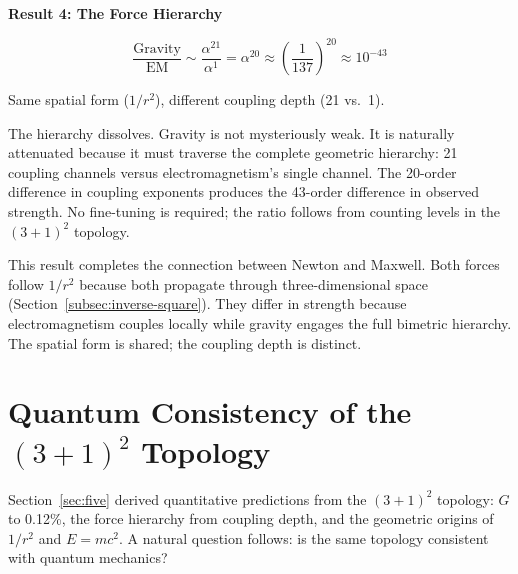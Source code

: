\documentclass[aps,prd,preprint,superscriptaddress,showpacs,preprintnumbers,amsmath,amssymb,nofootinbib]{revtex4-2}
\begin{document}
\vspace{1.5em}
\noindent
\colorbox{resultgreen}{\parbox{\dimexpr\textwidth-2\fboxsep\relax}{%
\vspace{0.8em}
\centering
\textbf{\large Result 4: The Force Hierarchy}

\vspace{0.5em}
\boldmath
\begin{equation}
\frac{\text{Gravity}}{\text{EM}} \sim \frac{\alpha^{21}}{\alpha^1} = \alpha^{20} \approx \left(\frac{1}{137}\right)^{20} \approx 10^{-43}
\end{equation}
\unboldmath

\vspace{0.3em}
Same spatial form ($1/r^2$), different coupling depth (21 vs.\ 1).
\vspace{0.5em}
}}
\vspace{1cm}

The hierarchy dissolves. Gravity is not mysteriously weak. It is naturally attenuated because it must traverse the complete geometric hierarchy: 21 coupling channels versus electromagnetism's single channel. The 20-order difference in coupling exponents produces the 43-order difference in observed strength. No fine-tuning is required; the ratio follows from counting levels in the $(3+1)^2$ topology.

This result completes the connection between Newton and Maxwell. Both forces follow $1/r^2$ because both propagate through three-dimensional space (Section~\ref{subsec:inverse-square}). They differ in strength because electromagnetism couples locally while gravity engages the full bimetric hierarchy. The spatial form is shared; the coupling depth is distinct.

\section{Quantum Consistency of the $(3+1)^2$ Topology}
\label{sec:four-more}

Section~\ref{sec:five} derived quantitative predictions from the $(3+1)^2$ topology: $G$ to 0.12\%, the force hierarchy from coupling depth, and the geometric origins of $1/r^2$ and $E = mc^2$. A natural question follows: is the same topology consistent with quantum mechanics?
\end{document}
